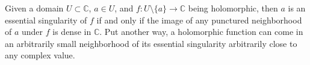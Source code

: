 \documentclass[12pt]{article}
\begin{document}
Given a domain $U\subset\mathbb{C}$, $a\in U$, and $f:U\setminus\{a\}\to\mathbb{C}$ being holomorphic, then $a$ is an essential singularity of $f$ if and only if the image of any punctured neighborhood of $a$ under $f$ is dense in $\mathbb{C}$. Put another way, a holomorphic function can come in an arbitrarily small neighborhood of its essential singularity arbitrarily close to any complex value.
\end{document}
